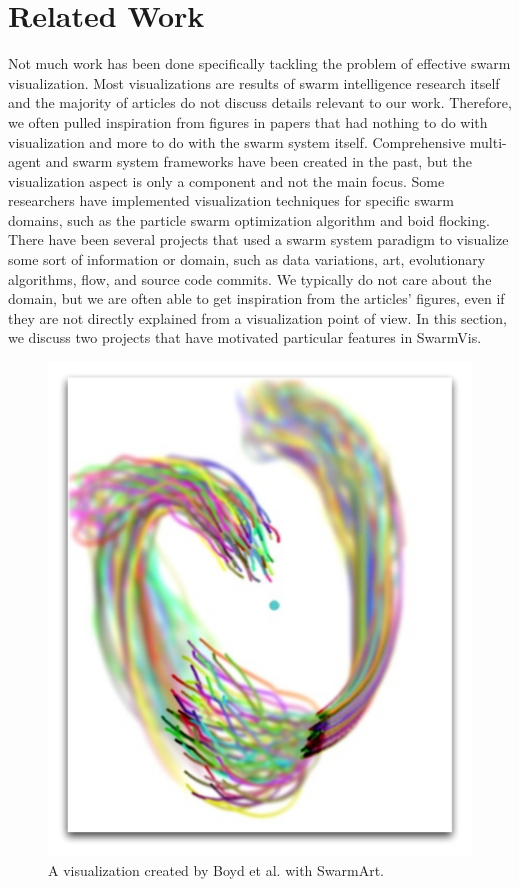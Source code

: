 \documentclass[conference]{IEEEtran}
\begin{document}
\section{Related Work}
Not much work has been done specifically tackling the problem of effective swarm visualization.
Most visualizations are results of swarm intelligence research itself and the majority of articles do not discuss details relevant to our work.
Therefore, we often pulled inspiration
from figures in papers that had nothing to do with visualization and more to do with the swarm system itself.
Comprehensive multi-agent and swarm system frameworks \cite{Luke}\cite{860347} have been created in the past,
but the visualization aspect is only a component and not the main focus.
Some researchers have implemented visualization techniques for specific swarm domains,
such as the particle swarm optimization algorithm\cite{Secrest} and boid flocking\cite{reynolds1987}.
There have been several projects that used a swarm system paradigm to visualize some sort of information or domain, such as 
data variations\cite{1382896}, art\cite{Boyd}, evolutionary algorithms\cite{spector2005ecb}\cite{Spector02evolutionarydynamics},
flow\cite{10.1109/TVCG.2005.87}\cite{Merzkirch}, and source code commits\cite{codeswarm:website}.
We typically do not care about the domain, but we are often able to get inspiration from the articles' figures, even if they are 
not directly explained from a visualization point of view.
In this section, we discuss two projects that have motivated particular features in SwarmVis.

\begin{figure}
\centering
\includegraphics[scale=.3]{images/SwarmArt.pdf}
\caption{A visualization created by Boyd et al. with SwarmArt\cite{Boyd}.}
\label{SwarmArt}
\end{figure}
\end{document}
